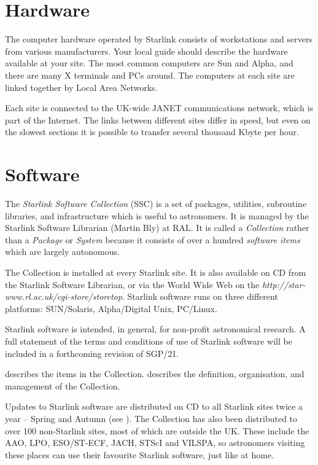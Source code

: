 \newpage

\section{Hardware}

The computer hardware operated by Starlink consists of workstations and
servers from various manufacturers.
Your local guide should describe the hardware available at your site.
The most common computers are Sun and Alpha, and there are many X terminals
and PCs around.
The computers at each site are linked together by Local Area Networks.

Each site is connected to the UK-wide JANET communications network, which is
part of the Internet.
The links between different sites differ in speed, but even on the slowest
sections it is possible to transfer several thousand Kbyte per hour.

\newpage

\section{Software}

The {\em Starlink Software Collection}\/ (SSC) is a set of packages, utilities,
subroutine libraries, and infrastructure which is useful to astronomers.
It is managed by the Starlink Software Librarian (Martin Bly) at RAL.
It is called a {\em Collection}\/ rather than a {\em Package}\/ or
{\em System}\/ because it consists of over a hundred {\em software items}\/
which are largely autonomous.

The Collection is installed at every Starlink site.
It is also available on CD from the Starlink Software Librarian, or via
the World Wide Web on the
{\em {}
{http://star-www.rl.ac.uk/cgi-store/storetop}}.
Starlink software runs on three different platforms: SUN/Solaris,
Alpha/Digital Unix, PC/Linux.

Starlink software is intended, in general, for non-profit astronomical research.
A full statement of the terms and conditions of use of Starlink software
will be included in a forthcoming revision of SGP/21.

 describes the items in the Collection.
 describes the definition, organisation, and management
of the Collection.

Updates to Starlink software are distributed on CD to all Starlink sites
twice a year -- Spring and Autumn (see ).
The Collection has also been distributed to over 100 non-Starlink sites, most of
which are outside the UK.
These include the AAO, LPO, ESO/ST-ECF, JACH, STScI and VILSPA, so astronomers
visiting these places can use their favourite Starlink software, just like at
home.

